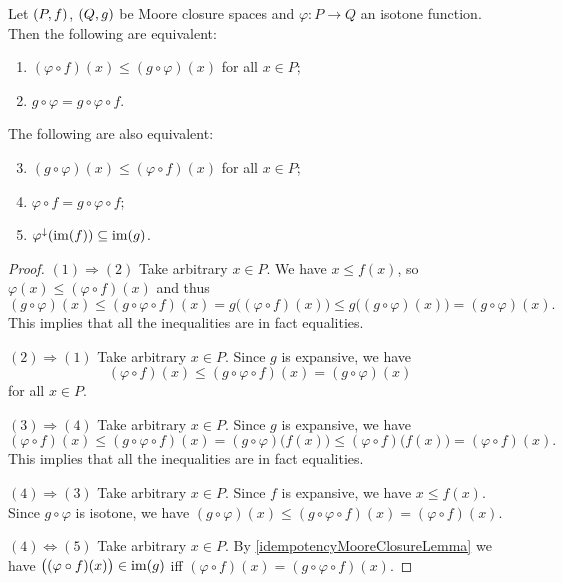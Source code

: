 \begin{lemma} \label{continuousFunctionsBetweenClosureSpaces}
Let $\sSet{P,f}$, $\sSet{Q,g}$ be Moore closure spaces and $\varphi: P\to Q$ an isotone function. Then the following are equivalent:
\begin{enumerate}
\item $(\varphi \circ f)(x) \leq (g\circ \varphi)(x)$ for all $x\in P$;
\item $g\circ \varphi = g\circ \varphi\circ f$.
\end{enumerate}
The following are also equivalent:
\begin{enumerate} \setcounter{enumi}{2}
\item $(g\circ \varphi)(x) \leq (\varphi\circ f)(x)$ for all $x\in P$;
\item $\varphi\circ f = g\circ \varphi\circ f$;
\item $\varphi^\downarrow(\operatorname{im}(f)) \subseteq \operatorname{im}(g)$.
\end{enumerate}
\end{lemma}
\begin{proof}
$(1) \Rightarrow (2)$ Take arbitrary $x\in P$. We have $x \leq f(x)$, so $\varphi(x) \leq (\varphi\circ f)(x)$ and thus
\[ (g\circ \varphi)(x) \leq (g\circ \varphi \circ f)(x) = g\big((\varphi\circ f)(x)\big) \leq g\big((g\circ \varphi)(x)\big) = (g\circ \varphi)(x). \]
This implies that all the inequalities are in fact equalities.

$(2) \Rightarrow (1)$ Take arbitrary $x\in P$. Since $g$ is expansive, we have
\[ (\varphi \circ f)(x) \leq (g\circ \varphi\circ f)(x) = (g\circ \varphi)(x) \]
for all $x\in P$.

$(3) \Rightarrow (4)$ Take arbitrary $x\in P$. Since $g$ is expansive, we have
\[ (\varphi\circ f)(x) \leq (g\circ \varphi \circ f)(x) = (g\circ \varphi)\big(f(x)\big) \leq (\varphi\circ f)\big(f(x)\big) = (\varphi\circ f)(x). \]
This implies that all the inequalities are in fact equalities.

$(4) \Rightarrow (3)$ Take arbitrary $x\in P$. Since $f$ is expansive, we have $x\leq f(x)$. Since $g\circ \varphi$ is isotone, we have $(g\circ \varphi)(x) \leq (g\circ \varphi\circ f)(x) = (\varphi\circ f)(x)$.

$(4) \Leftrightarrow (5)$ Take arbitrary $x\in P$. By \ref{idempotencyMooreClosureLemma} we have $\big((\varphi\circ f)(x)\big) \in \operatorname{im}(g)$ iff $(\varphi\circ f)(x) = (g\circ \varphi\circ f)(x)$.
\end{proof}

